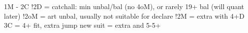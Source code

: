 1M - 2C
!2D = catchall: min unbal/bal (no 4oM), or rarely 19+ bal (will quant later)
    !2oM = art unbal, usually not suitable for declare
!2M = extra with 4+D
3C = 4+ fit, extra
jump new suit = extra and 5-5+